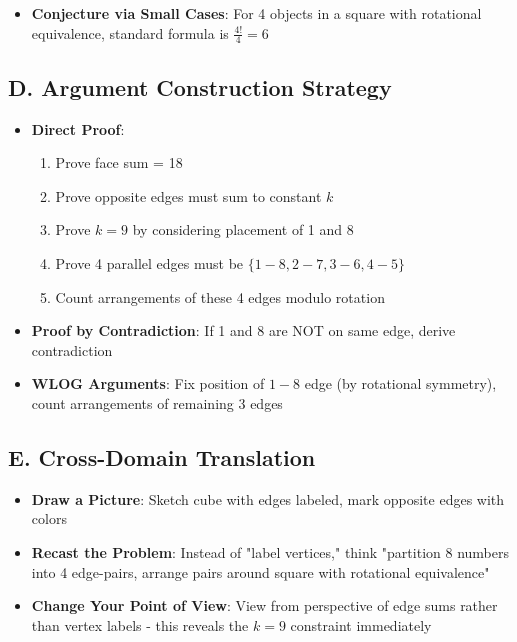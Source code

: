 \documentclass[]{article}
\begin{document}
\begin{strategicbox}
\begin{itemize}[leftmargin=*]
    \item \textbf{Conjecture via Small Cases}: For 4 objects in a square with rotational equivalence, standard formula is $\frac{4!}{4} = 6$
\end{itemize}

\subsection*{D. Argument Construction Strategy}
\begin{itemize}[leftmargin=*]
    \item \textbf{Direct Proof}: 
    \begin{enumerate}
        \item Prove face sum = 18
        \item Prove opposite edges must sum to constant $k$
        \item Prove $k = 9$ by considering placement of 1 and 8
        \item Prove 4 parallel edges must be $\{1-8, 2-7, 3-6, 4-5\}$
        \item Count arrangements of these 4 edges modulo rotation
    \end{enumerate}
    
    \item \textbf{Proof by Contradiction}: If 1 and 8 are NOT on same edge, derive contradiction
    
    \item \textbf{WLOG Arguments}: Fix position of $1-8$ edge (by rotational symmetry), count arrangements of remaining 3 edges
\end{itemize}

\subsection*{E. Cross-Domain Translation}
\begin{itemize}[leftmargin=*]
    \item \textbf{Draw a Picture}: Sketch cube with edges labeled, mark opposite edges with colors
    
    \item \textbf{Recast the Problem}: Instead of "label vertices," think "partition 8 numbers into 4 edge-pairs, arrange pairs around square with rotational equivalence"
    
    \item \textbf{Change Your Point of View}: View from perspective of edge sums rather than vertex labels - this reveals the $k=9$ constraint immediately
\end{itemize}
\end{strategicbox}
\end{document}
